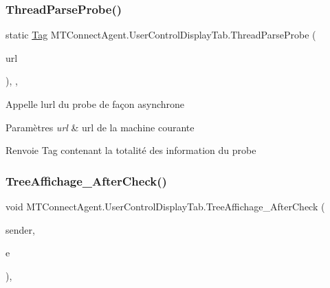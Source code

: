 \subsubsection{\texorpdfstring{Thread\+Parse\+Probe()}{ThreadParseProbe()}}
{\footnotesize\ttfamily static \mbox{\hyperlink{class_m_t_connect_agent_1_1_model_1_1_tag}{Tag}} M\+T\+Connect\+Agent.\+User\+Control\+Display\+Tab.\+Thread\+Parse\+Probe (\begin{DoxyParamCaption}\item[{string}]{url }\end{DoxyParamCaption})\hspace{0.3cm}{\ttfamily [inline]}, {\ttfamily [static]}, {\ttfamily [private]}}



Appelle l\textquotesingle{}url du probe de façon asynchrone 


\begin{DoxyParams}{Paramètres}
{\em url} & url de la machine courante\\
\hline
\end{DoxyParams}
\begin{DoxyReturn}{Renvoie}
Tag contenant la totalité des information du probe
\end{DoxyReturn}
\mbox{\label{class_m_t_connect_agent_1_1_user_control_display_tab_a867300e7d41f63cf0e728ba0f137af94}} 
\subsubsection{\texorpdfstring{Tree\+Affichage\+\_\+\+After\+Check()}{TreeAffichage\_AfterCheck()}}
{\footnotesize\ttfamily void M\+T\+Connect\+Agent.\+User\+Control\+Display\+Tab.\+Tree\+Affichage\+\_\+\+After\+Check (\begin{DoxyParamCaption}\item[{object}]{sender,  }\item[{Tree\+View\+Event\+Args}]{e }\end{DoxyParamCaption})\hspace{0.3cm}{\ttfamily [inline]}, {\ttfamily [private]}}




